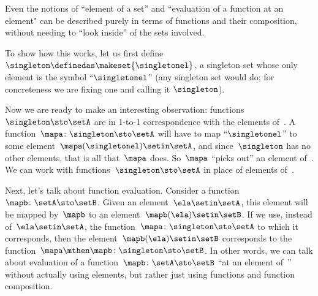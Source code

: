 \begin{example}
    Even the notions of ``element of a set'' and ``evaluation of a function at an element" can be described purely in terms of functions and their composition, without needing to ``look inside'' of the sets involved.

    To show how this works, let us first define $\singleton \definedas \makeset{\singletonel}$, a singleton set whose only element is the symbol ``$\singletonel$'' (any singleton set would do; for concreteness we are fixing one and calling it $\singleton$).

    Now we are ready to make an interesting observation: functions~$\singleton \sto \setA$ are in 1-to-1 correspondence with the elements of~\setA.
    A function~$\mapa\colon \singleton \sto \setA$ will have to map ``$\singletonel$'' to some element~$\mapa(\singletonel) \setin\setA$, and since~$\singleton$ has no other elements, that is all that~$\mapa$ does.
    So~$\mapa$ ``picks out'' an element of~\setA.
    We can work with functions~$\singleton \sto \setA$ in place of elements of~\setA.

    Next, let's talk about function evaluation.
    Consider a function~$\mapb \colon \setA \sto \setB$.
    Given an element~$\ela \setin\setA$, this element will be mapped by~$\mapb$ to an element~$\mapb(\ela) \setin\setB$.
    If we use, instead of~$\ela \setin\setA$, the function~$\mapa \colon \singleton \sto \setA$ to which it corresponds, then the element~$\mapb(\ela) \setin\setB$ corresponds to the function~$\mapa \mthen \mapb\colon \singleton \sto \setB$.
    In other words, we can talk about evaluation of a function~$\mapb \colon \setA \sto \setB$ ``at an element of~\setA'' without actually using elements, but rather just using functions and function composition.
\end{example}


